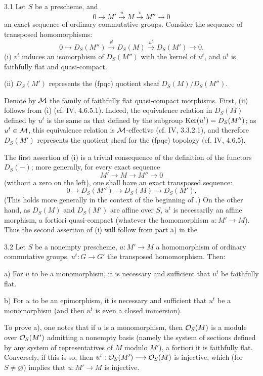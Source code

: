 \begin{theorem}{3.1}\label{VIII.3.1}
Let $S$ be a prescheme, and
\[
0\to M'\xrightarrow{u}M\xrightarrow{v}M''\to0
\]
an exact sequence of ordinary commutative groups. Consider the sequence of transposed homomorphisms:
\[
0\to D_S(M'')\xrightarrow{v^t}D_S(M)\xrightarrow{u^t}D_S(M')\to0.
\]
(i) $v^t$ induces an isomorphism of $D_S(M'')$ with the kernel of $u^t$, and $u^t$ is faithfully flat and quasi-compact.

(ii) $D_S(M')$ represents the (fpqc) quotient sheaf $D_S(M)/D_S(M'')$.
\end{theorem}
Denote by $\cal M$ the family of faithfully flat quasi-compact morphisms. First, (ii) follows from (i) (cf. IV, 4.6.5.1). Indeed, the equivalence relation in $D_S(M)$ defined by $u^t$ is the same as that defined by the subgroup $\Ker(u^t)=D_S(M'')$; as $u^t\in\cal M$, this equivalence relation is $\cal M$-effective (cf. IV, 3.3.2.1), and therefore $D_S(M')$ represents the quotient sheaf for the (fpqc) topology (cf. IV, 4.6.5).

The first assertion of (i) is a trivial consequence of the definition of the functors $D_S(-)$; more generally, for every exact sequence
\[
M'\to M\to M''\to0
\]
(without a zero on the left), one shall have an exact transposed sequence:
\[
0\to D_S(M'')\to D_S(M)\to D_S(M').
\]
(This holds more generally in the context of the beginning of .) On the other hand, as $D_S(M)$ and $D_S(M')$ are affine over $S$, $u^t$ is necessarily an affine morphism, a fortiori quasi-compact (whatever the homomorphism $u:M'\to M$). Thus the second assertion of (i) will follow from part a) in the
\begin{corollary}{3.2}\label{VIII.3.2}
Let $S$ be a nonempty prescheme, $u:M'\to M$ a homomorphism of ordinary commutative groups, $u^t:G\to G'$ the transposed homomorphism. Then:

a) For $u$ to be a monomorphism, it is necessary and sufficient that $u^t$ be faithfully flat.

b) For $u$ to be an epimorphism, it is necessary and sufficient that $u^t$ be a monomorphism (and then $u^t$ is even a closed immersion).
\end{corollary}
To prove a), one notes that if $u$ is a monomorphism, then $\OS(M)$ is a module over $\OS(M')$ admitting a nonempty basis (namely the system of sections defined by any system of representatives of $M$ modulo $M'$), a fortiori it is faithfully flat. Conversely, if this is so, then $u^t:\OS(M')\to\OS(M)$ is injective, which (for $S\ne\varnothing$) implies that $u:M'\to M$ is injective.

